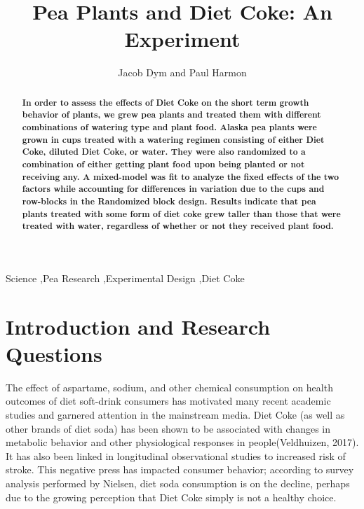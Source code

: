 \documentclass[1p,12pt]{elsarticle}\usepackage[]{graphicx}\usepackage[]{color}
\begin{document}
\begin{frontmatter}


\title{Pea Plants and Diet Coke: An Experiment}

\author{Jacob Dym and Paul Harmon}

\address{Montana State University}

\begin{abstract}
\textbf{
In order to assess the effects of Diet Coke on the short term growth behavior of plants, we grew pea plants and treated them with different combinations of watering type and plant food. Alaska pea plants were grown in cups treated with a watering regimen consisting of either Diet Coke, diluted Diet Coke, or water. They were also randomized to a combination of either getting plant food upon being planted or not receiving any. A mixed-model was fit to analyze the fixed effects of the two factors while accounting for differences in variation due to the cups and row-blocks in the Randomized block design. Results indicate that pea plants treated with some form of diet coke grew taller than those that were treated with water, regardless of whether or not they received plant food.
}
\end{abstract}
\begin{keyword}
Science \sep Pea Research \sep Experimental Design \sep Diet Coke
\end{keyword}


\end{frontmatter}



\section{Introduction and Research Questions}

The effect of aspartame, sodium, and other chemical consumption on health outcomes of diet soft-drink consumers has motivated many recent academic studies and garnered attention in the mainstream media. Diet Coke (as well as other brands of diet soda) has been shown to be associated with changes in metabolic behavior and other physiological responses  in people(Veldhuizen, 2017). It has also been linked in longitudinal observational studies to increased risk of stroke. This negative press has impacted consumer behavior; according to survey analysis performed by Nielsen, diet soda consumption is on the decline, perhaps due to the growing perception that Diet Coke simply is not a healthy choice.
\end{document}
